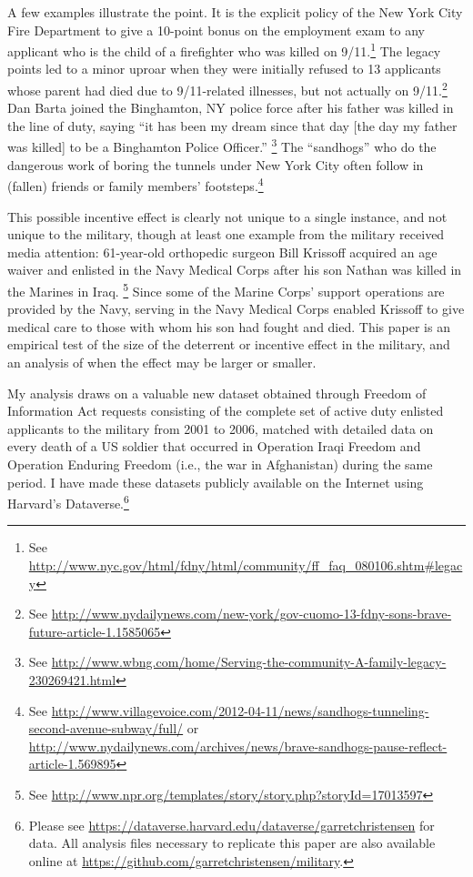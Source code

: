\documentclass[12pt] {article}
\begin{document}
A few examples illustrate the point.  It is the explicit policy of the New York City Fire Department to give a 10-point bonus on the employment exam to any applicant who is the child of a firefighter who was killed on 9/11.\footnote {See \url{http://www.nyc.gov/html/fdny/html/community/ff_faq_080106.shtm\#legacy}} The legacy points led to a minor uproar when they were initially refused to 13 applicants whose parent had died due to 9/11-related illnesses, but not actually on 9/11.\footnote{See \url{http://www.nydailynews.com/new-york/gov-cuomo-13-fdny-sons-brave-future-article-1.1585065}} Dan Barta joined the Binghamton, NY police force after his father was killed in the line of duty, saying ``it has been my dream since that day [the day my father was killed] to be a Binghamton Police Officer.'' 
\footnote{See \url{http://www.wbng.com/home/Serving-the-community-A-family-legacy-230269421.html}} The ``sandhogs'' who do the dangerous work of boring the tunnels under New York City often follow in (fallen) friends or family members' footsteps.\footnote{See \url{http://www.villagevoice.com/2012-04-11/news/sandhogs-tunneling-second-avenue-subway/full/} or \url{http://www.nydailynews.com/archives/news/brave-sandhogs-pause-reflect-article-1.569895}} 

This possible incentive effect is clearly not unique to a single instance, and not unique to the military, though at least one example from the military received media attention: 61-year-old orthopedic surgeon Bill Krissoff acquired an age waiver and enlisted in the Navy Medical Corps after his son Nathan was killed in the Marines in Iraq.
\footnote{See \url{http://www.npr.org/templates/story/story.php?storyId=17013597}}
Since some of the Marine Corps' support operations are provided by the Navy, serving in the Navy Medical Corps enabled Krissoff to give medical care to those with whom his son had fought and died.  This paper is an empirical test of the size of the deterrent or incentive effect in the military, and an analysis of when the effect may be larger or smaller. 


My analysis draws on a valuable new dataset obtained through Freedom of Information Act requests consisting of the complete set of active duty enlisted applicants to the military from 2001 to 2006, matched with detailed data on every death of a US soldier that occurred in Operation Iraqi Freedom and Operation
Enduring Freedom (i.e., the war in Afghanistan) during the same period. I have made these datasets publicly available on the Internet using Harvard's Dataverse.\footnote{Please see \url{https://dataverse.harvard.edu/dataverse/garretchristensen} for data. All analysis files necessary to replicate this paper are also available online at \url{https://github.com/garretchristensen/military}.}
\end{document}
